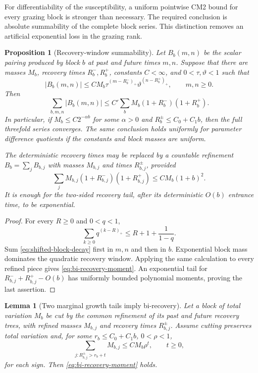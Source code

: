 \documentclass[11pt]{article}
\newtheorem{proposition}[theorem]{Proposition}
\newtheorem{lemma}[theorem]{Lemma}
\begin{document}
For differentiability of the susceptibility, a uniform pointwise CM2 bound
for every grazing block is stronger than necessary.  The required conclusion
is absolute summability of the complete block series.  This distinction
removes an artificial exponential loss in the grazing rank.

\begin{proposition}[Recovery-window summability]
\label{prop:recovery-window-summability}
Let $B_b(m,n)$ be the scalar pairing produced by block $b$ at past and future
times $m,n$.  Suppose that there are masses $M_b$, recovery times
$R_b^-,R_b^+$, constants $C<\infty$, and $0<\tau,\vartheta<1$ such that
\begin{equation}
\label{eq:shifted-block-decay}
 |B_b(m,n)|
 \le CM_b\tau^{(m-R_b^-)_{+}}
             \vartheta^{(n-R_b^+)_{+}},
 \qquad m,n\ge0.
\end{equation}
Then
\begin{equation}
\label{eq:recovery-window-sum}
 \sum_{b,m,n}|B_b(m,n)|
 \le C'
 \sum_bM_b(1+R_b^-)(1+R_b^+).
\end{equation}
In particular, if $M_b\le C2^{-\alpha b}$ for some $\alpha>0$ and
$R_b^\pm\le C_0+C_1b$, then the full threefold series converges.  The same
conclusion holds uniformly for parameter difference quotients if the
constants and block masses are uniform.

The deterministic recovery times may be replaced by a countable refinement
$B_b=\sum_jB_{b,j}$ with masses $M_{b,j}$ and times $R_{b,j}^\pm$, provided
\begin{equation}
\label{eq:bi-recovery-moment}
 \sum_jM_{b,j}(1+R_{b,j}^-)(1+R_{b,j}^+)
 \le CM_b(1+b)^2.
\end{equation}
It is enough for the two-sided recovery tail, after its deterministic
$O(b)$ entrance time, to be exponential.
\end{proposition}

\begin{proof}
For every $R\ge0$ and $0<q<1$,
\[
 \sum_{k\ge0}q^{(k-R)_+}
 \le R+1+\frac1{1-q}.
\]
Sum \eqref{eq:shifted-block-decay} first in $m,n$ and then in $b$.
Exponential block mass dominates the quadratic recovery window.  Applying the
same calculation to every refined piece gives
\eqref{eq:bi-recovery-moment}.  An exponential tail for
$R_{b,j}^-+R_{b,j}^+-O(b)$ has uniformly bounded polynomial moments, proving
the last assertion.
\end{proof}

\begin{lemma}[Two marginal growth tails imply bi-recovery]
\label{lem:marginal-to-bi-recovery}
Let a block of total variation $M_b$ be cut by the common refinement of its
past and future recovery trees, with refined masses $M_{b,j}$ and recovery
times $R_{b,j}^\pm$.  Assume cutting preserves total variation and, for some
$r_b\le C_0+C_1b$, $0<\rho<1$,
\[
 \sum_{j:R_{b,j}^\pm>r_b+t}M_{b,j}
 \le CM_b\rho^t,
 \qquad t\ge0,
\]
for each sign.  Then \eqref{eq:bi-recovery-moment} holds.
\end{lemma}
\end{document}
